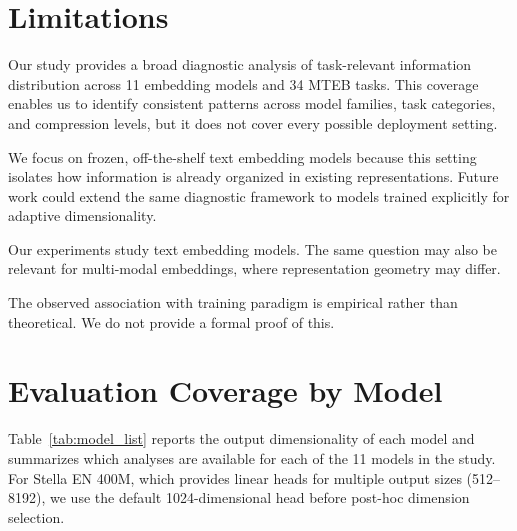 \documentclass[11pt]{article}
\begin{document}
\label{sec:bibtex}

\section*{Limitations}
Our study provides a broad diagnostic analysis of task-relevant information distribution across 11 embedding models and 34 MTEB tasks. This coverage enables us to identify consistent patterns across model families, task categories, and compression levels, but it does not cover every possible deployment setting.

We focus on frozen, off-the-shelf text embedding models because this setting isolates how information is already organized in existing representations. Future work could extend the same diagnostic framework to models trained explicitly for adaptive dimensionality.

Our experiments study text embedding models. The same question may also be relevant for multi-modal embeddings, where representation geometry may differ. 

The observed association with training paradigm is empirical rather than theoretical. We do not provide a formal proof of this.

%

\clearpage

\appendix

\appendix
\section{Evaluation Coverage by Model}
\label{sec:coverage}
Table~\ref{tab:model_list} reports the output dimensionality of each model and summarizes which analyses are available for each of the 11 models in the study. For Stella EN 400M, which provides linear heads for multiple output sizes (512--8192), we use the default 1024-dimensional head before post-hoc dimension selection.
\end{document}

